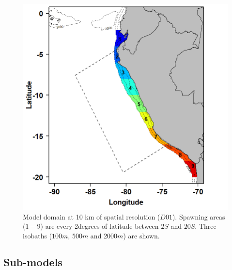 \begin{figure}[ht]
	\includegraphics[width=1.0\textwidth]{figures/Chap3SpawningZone.png}
	\centering
	\caption{Model domain at 10 km of spatial resolution ($D01$). Spawning areas ($1 - 9$) are every 2\textdegree degrees of latitude between $2$\textdegree $S$ and $20$\textdegree $S$. Three isobaths ($100 m$, $500 m$ and $2000 m$) are shown.}
	\label{Chap3SpawningZone}
\end{figure}

\subsection{Sub-models}

